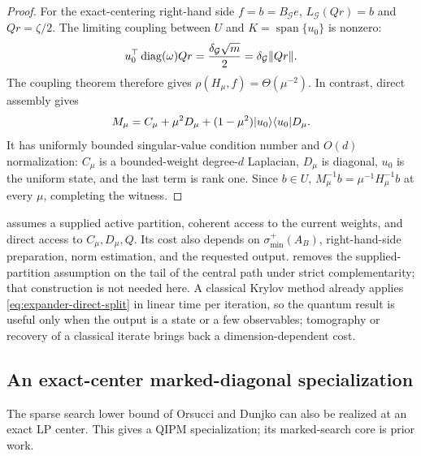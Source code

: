 \begin{proof}
For the exact-centering right-hand side $f=b=B_{\mathcal G}e$,
$L_{\mathcal G}(Qr)=b$ and $Qr=\zeta/2$.  The limiting coupling between $U$
and $K=\operatorname{span}\{u_0\}$ is nonzero:
\begin{equation}
 u_0^\top\operatorname{diag}(\omega)Qr=\frac{\delta_{\mathcal G}\sqrt m}{2}
 =\delta_{\mathcal G}\lVert Qr\rVert.
 \label{eq:expander-coupling}
\end{equation}
The coupling theorem therefore gives $\rho(H_\mu,f)=\Theta(\mu^{-2})$.
In contrast, direct assembly gives
\begin{equation}
 M_\mu=C_\mu+\mu^2D_\mu
 +(1-\mu^2)\lvert u_0\rangle\langle u_0\rvert D_\mu.
 \label{eq:expander-direct-split}
\end{equation}
It has uniformly bounded singular-value condition number and $O(d)$
normalization: $C_\mu$ is
a bounded-weight degree-$d$ Laplacian, $D_\mu$ is diagonal, $u_0$ is the
uniform state, and the last term is rank one.  Since $b\in U$,
$M_\mu^{-1}b=\mu^{-1}H_\mu^{-1}b$ at every $\mu$, completing the witness.
\end{proof}

 assumes a supplied active partition,
coherent access to the current weights, and direct access to
$C_\mu,D_\mu,Q$.  Its cost also depends on $\sigma_{\min}^+(A_B)$,
right-hand-side preparation, norm estimation, and the requested output.
 removes the supplied-partition assumption on
the tail of the central path under strict complementarity; that
construction is not needed here.  A classical Krylov method already applies
\eqref{eq:expander-direct-split} in linear time per iteration, so the
quantum result is useful only when the output is a state or a few
observables; tomography or recovery of a classical iterate brings back a
dimension-dependent cost.

\subsection{An exact-center marked-diagonal specialization}
\label{sec:marked-diagonal-specialization}

The sparse search lower bound of Orsucci and Dunjko
\cite[Proposition~7]{orsucci2021-on-solving-classes-of-positive} can also be
realized at an exact LP center.  This gives a QIPM specialization; its
marked-search core is prior work.

